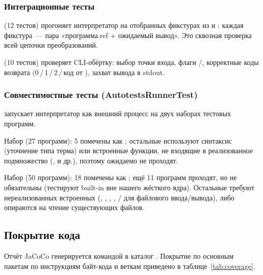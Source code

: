 \subsubsection{Интеграционные тесты}

 (12 тестов) прогоняет интерпретатор на
отобранных фикстурах из  и
: каждая фикстура~--- пара «программа.ref + ожидаемый вывод».
Это сквозная проверка всей цепочки преобразований.

 (10 тестов) проверяет CLI-обёртку: выбор точки входа,
флаги /, корректные коды возврата
(0\,/\,1\,/\,2\,/\,код от ), захват вывода в stdout.

\subsubsection{Совместимостные тесты (AutotestsRunnerTest)}

 запускает интерпретатор как внешний процесс на
двух наборах тестовых программ.

Набор  (27 программ): 5 помечены как ;
остальные используют синтаксис \prog{:} (уточнение типа терма) или встроенные
функции, не входящие в реализованное подмножество (,
 и др.), поэтому ожидаемо не проходят.

Набор  (50 программ): 18 помечены как ;
ещё 11 программ проходят, но не обязательны (тестируют built-in вне нашего
жёсткого ядра). Остальные требуют нереализованных встроенных
(, , , , /
для файлового ввода/вывода), либо опираются на чтение существующих файлов.

\subsection{Покрытие кода}
\label{subsec:coverage}

Отчёт JaCoCo генерируется командой  в каталог
. Покрытие по основным пакетам по инструкциям
байт-кода и веткам приведено в таблице~\ref{tab:coverage}.


